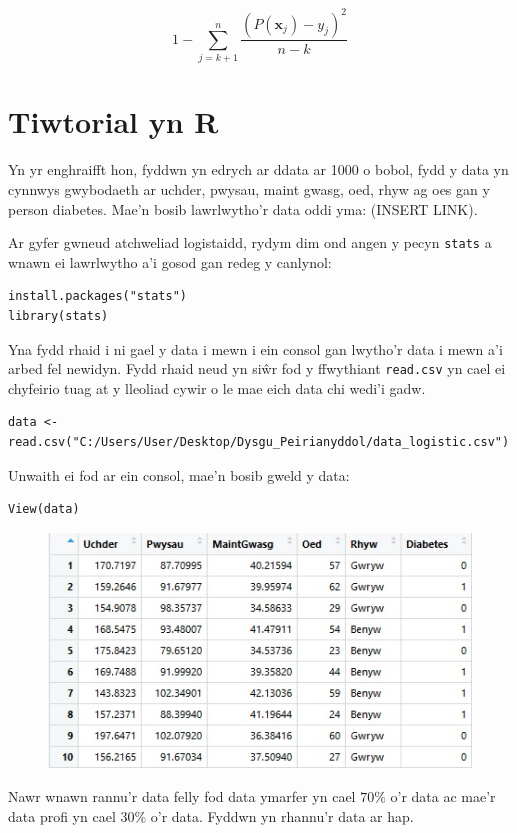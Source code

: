$$ 1 - \sum_{j = k+1}^{n} \frac{(P(\mathbf{x}_j) - y_j)^{2}}{n - k} $$


\section{Tiwtorial yn R}

Yn yr enghraifft hon, fyddwn yn edrych ar ddata ar 1000 o bobol, fydd y data yn cynnwys gwybodaeth ar uchder, pwysau, maint gwasg, oed, rhyw ag oes gan y person diabetes. Mae'n bosib lawrlwytho'r data oddi yma: (INSERT LINK). 

Ar gyfer gwneud atchweliad logistaidd, rydym dim ond angen y pecyn \texttt{stats} a wnawn ei lawrlwytho a'i gosod gan redeg y canlynol:

\begin{verbatim}
install.packages("stats")
library(stats)
\end{verbatim}

Yna fydd rhaid i ni gael y data i mewn i ein consol gan lwytho'r data i mewn a'i arbed fel newidyn. Fydd rhaid neud yn si\^{w}r fod y ffwythiant \texttt{read.csv} yn cael ei chyfeirio tuag at y lleoliad cywir o le mae eich data chi wedi'i gadw.

\begin{verbatim}
data <- read.csv("C:/Users/User/Desktop/Dysgu_Peirianyddol/data_logistic.csv")
\end{verbatim}

Unwaith ei fod ar ein consol, mae'n bosib gweld y data:

\begin{verbatim}
View(data)
\end{verbatim}

\begin{figure}[H]
\begin{center}
\includegraphics[width=0.5\linewidth]{../img/data_diabetes_r.jpg}
\end{center}
\end{figure}

Nawr wnawn rannu'r data felly fod data ymarfer yn cael $70\%$ o'r data ac mae'r data profi yn cael $30\%$ o'r data. Fyddwn yn rhannu'r data ar hap. 


